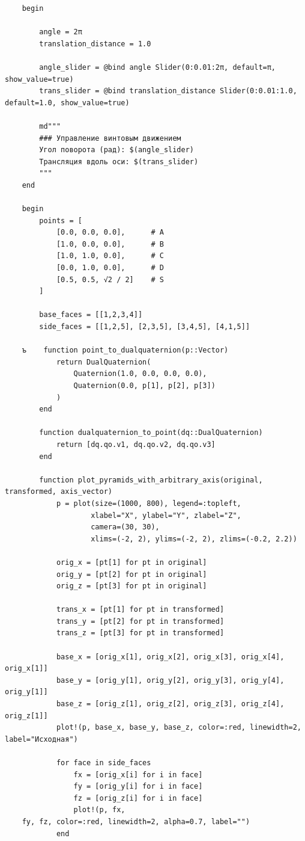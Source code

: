 \begin{verbatim}
    begin

        angle = 2π
        translation_distance = 1.0

        angle_slider = @bind angle Slider(0:0.01:2π, default=π, show_value=true)
        trans_slider = @bind translation_distance Slider(0:0.01:1.0, default=1.0, show_value=true)

        md"""
        ### Управление винтовым движением
        Угол поворота (рад): $(angle_slider)  
        Трансляция вдоль оси: $(trans_slider)
        """
    end

    begin
        points = [
            [0.0, 0.0, 0.0],      # A
            [1.0, 0.0, 0.0],      # B
            [1.0, 1.0, 0.0],      # C
            [0.0, 1.0, 0.0],      # D
            [0.5, 0.5, √2 / 2]    # S
        ]

        base_faces = [[1,2,3,4]]
        side_faces = [[1,2,5], [2,3,5], [3,4,5], [4,1,5]]

    ъ    function point_to_dualquaternion(p::Vector)
            return DualQuaternion(
                Quaternion(1.0, 0.0, 0.0, 0.0),
                Quaternion(0.0, p[1], p[2], p[3])
            )
        end

        function dualquaternion_to_point(dq::DualQuaternion)
            return [dq.qo.v1, dq.qo.v2, dq.qo.v3]
        end

        function plot_pyramids_with_arbitrary_axis(original, transformed, axis_vector)
            p = plot(size=(1000, 800), legend=:topleft, 
                    xlabel="X", ylabel="Y", zlabel="Z",
                    camera=(30, 30),
                    xlims=(-2, 2), ylims=(-2, 2), zlims=(-0.2, 2.2))

            orig_x = [pt[1] for pt in original]
            orig_y = [pt[2] for pt in original] 
            orig_z = [pt[3] for pt in original]

            trans_x = [pt[1] for pt in transformed]
            trans_y = [pt[2] for pt in transformed]
            trans_z = [pt[3] for pt in transformed]

            base_x = [orig_x[1], orig_x[2], orig_x[3], orig_x[4], orig_x[1]]
            base_y = [orig_y[1], orig_y[2], orig_y[3], orig_y[4], orig_y[1]]
            base_z = [orig_z[1], orig_z[2], orig_z[3], orig_z[4], orig_z[1]]
            plot!(p, base_x, base_y, base_z, color=:red, linewidth=2, label="Исходная")

            for face in side_faces
                fx = [orig_x[i] for i in face]
                fy = [orig_y[i] for i in face] 
                fz = [orig_z[i] for i in face]
                plot!(p, fx,
    fy, fz, color=:red, linewidth=2, alpha=0.7, label="")
            end


\end{verbatim}
